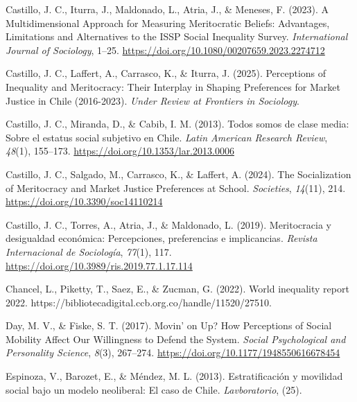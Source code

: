 \documentclass[
  13pt,
]{article}
\newlength{\cslhangindent}
\newenvironment{CSLReferences}[2] %
 {\begin{list}{}{%
  \setlength{\itemindent}{0pt}
  \setlength{\leftmargin}{0pt}
  \setlength{\parsep}{0pt}
  \ifodd #1
   \setlength{\leftmargin}{\cslhangindent}
   \setlength{\itemindent}{-1\cslhangindent}
  \fi
  \setlength{\itemsep}{#2\baselineskip}}}
 {\end{list}}
\begin{document}
\begin{CSLReferences}{1}{0}
Castillo, J. C., Iturra, J., Maldonado, L., Atria, J., \& Meneses, F.
(2023). A {Multidimensional Approach} for {Measuring Meritocratic
Beliefs}: {Advantages}, {Limitations} and {Alternatives} to the {ISSP
Social Inequality Survey}. \emph{International Journal of Sociology},
1--25. \url{https://doi.org/10.1080/00207659.2023.2274712}

Castillo, J. C., Laffert, A., Carrasco, K., \& Iturra, J. (2025).
Perceptions of {Inequality} and {Meritocracy}: {Their Interplay} in
{Shaping Preferences} for {Market Justice} in {Chile} (2016-2023).
\emph{Under Review at Frontiers in Sociology}.

Castillo, J. C., Miranda, D., \& Cabib, I. M. (2013). Todos somos de
clase media: {Sobre} el estatus social subjetivo en {Chile}. \emph{Latin
American Research Review}, \emph{48}(1), 155--173.
\url{https://doi.org/10.1353/lar.2013.0006}

Castillo, J. C., Salgado, M., Carrasco, K., \& Laffert, A. (2024). The
{Socialization} of {Meritocracy} and {Market Justice Preferences} at
{School}. \emph{Societies}, \emph{14}(11), 214.
\url{https://doi.org/10.3390/soc14110214}

Castillo, J. C., Torres, A., Atria, J., \& Maldonado, L. (2019).
Meritocracia y desigualdad econ{ó}mica: {Percepciones}, preferencias e
implicancias. \emph{Revista Internacional de Sociolog{í}a},
\emph{77}(1), 117. \url{https://doi.org/10.3989/ris.2019.77.1.17.114}

Chancel, L., Piketty, T., Saez, E., \& Zucman, G. (2022). World
inequality report 2022.
https://bibliotecadigital.ccb.org.co/handle/11520/27510.

Day, M. V., \& Fiske, S. T. (2017). Movin' on {Up}? {How Perceptions} of
{Social Mobility Affect Our Willingness} to {Defend} the {System}.
\emph{Social Psychological and Personality Science}, \emph{8}(3),
267--274. \url{https://doi.org/10.1177/1948550616678454}

Espinoza, V., Barozet, E., \& Méndez, M. L. (2013). {Estratificaci{ó}n y
movilidad social bajo un modelo neoliberal: El caso de Chile}.
\emph{Lavboratorio}, (25).


\end{CSLReferences}
\end{document}
